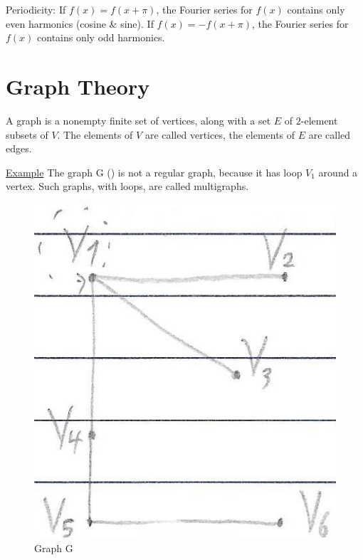 \documentclass[12pt]{article}
\begin{document}
\begin{flushleft}
	Periodicity: \linebreak 
	\textbullet \quad If $f(x)=f(x+\pi)$, the Fourier series for $f(x)$ contains only even harmonics (cosine \& sine). \linebreak 
	\textbullet \quad If $f(x) = -f(x+ \pi)$, the Fourier series for $f(x)$ contains only odd harmonics. \linebreak 
	
	
	\pagebreak
	
	
   \section{Graph Theory}

	\textbullet \quad A graph is a nonempty finite set of vertices, along with a set $E$ of $2$-element subsets of $V$. The elements of $V$ are called vertices, the elements of $E$ are called edges. \linebreak 
	
	\uline{Example} \linebreak 
	The graph G () is not a regular graph, because it has loop $V_1$ around a vertex. Such graphs, with loops, are called multigraphs. \linebreak 
	
	\begin{figure}[H]
	\centering
	\includegraphics[scale=2]{graphG}
	\caption{Graph G}
	\label{fig:graphG}
	\end{figure}


\end{flushleft}
\end{document}
